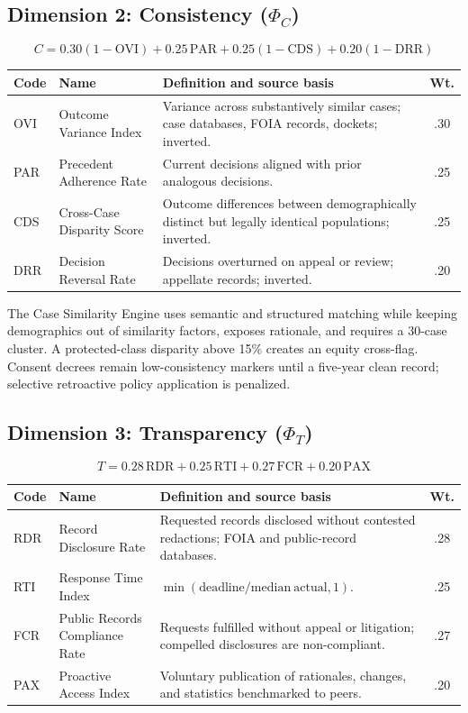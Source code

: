 \subsection{Dimension 2: Consistency (\(\Phi_C\))}

\[
C = 0.30(1-\mathrm{OVI})+0.25\,\mathrm{PAR}+0.25(1-\mathrm{CDS})+0.20(1-\mathrm{DRR})
\]

\begin{center}
\begin{tabular}{p{1.4cm}p{4cm}p{6.7cm}c}
\toprule
Code & Name & Definition and source basis & Wt. \\
\midrule
OVI & Outcome Variance Index & Variance across substantively similar cases; case databases, FOIA records, dockets; inverted. & .30 \\
PAR & Precedent Adherence Rate & Current decisions aligned with prior analogous decisions. & .25 \\
CDS & Cross-Case Disparity Score & Outcome differences between demographically distinct but legally identical populations; inverted. & .25 \\
DRR & Decision Reversal Rate & Decisions overturned on appeal or review; appellate records; inverted. & .20 \\
\bottomrule
\end{tabular}
\end{center}

The Case Similarity Engine uses semantic and structured matching while keeping
demographics out of similarity factors, exposes rationale, and requires a
30-case cluster. A protected-class disparity above 15\% creates an equity
cross-flag. Consent decrees remain low-consistency markers until a five-year
clean record; selective retroactive policy application is penalized.

\subsection{Dimension 3: Transparency (\(\Phi_T\))}

\[
T = 0.28\,\mathrm{RDR}+0.25\,\mathrm{RTI}+0.27\,\mathrm{FCR}+0.20\,\mathrm{PAX}
\]

\begin{center}
\begin{tabular}{p{1.4cm}p{4cm}p{6.7cm}c}
\toprule
Code & Name & Definition and source basis & Wt. \\
\midrule
RDR & Record Disclosure Rate & Requested records disclosed without contested redactions; FOIA and public-record databases. & .28 \\
RTI & Response Time Index & \(\min(\mathrm{deadline}/\mathrm{median\ actual},1)\). & .25 \\
FCR & Public Records Compliance Rate & Requests fulfilled without appeal or litigation; compelled disclosures are non-compliant. & .27 \\
PAX & Proactive Access Index & Voluntary publication of rationales, changes, and statistics benchmarked to peers. & .20 \\
\bottomrule
\end{tabular}
\end{center}

